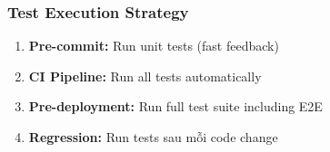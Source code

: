 \subsubsection{Test Execution Strategy}
\begin{enumerate}
    \item \textbf{Pre-commit:} Run unit tests (fast feedback)
    \item \textbf{CI Pipeline:} Run all tests automatically
    \item \textbf{Pre-deployment:} Run full test suite including E2E
    \item \textbf{Regression:} Run tests sau mỗi code change
\end{enumerate}
